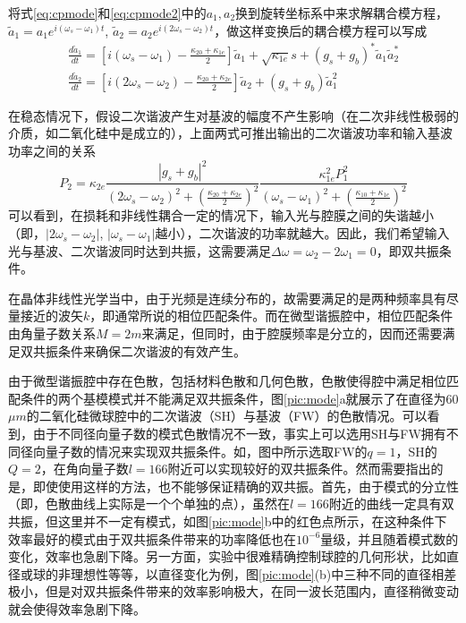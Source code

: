 将式\ref{eq:cpmode}和\ref{eq:cpmode2}中的$a_1, a_2$换到旋转坐标系中来求解耦合模方程，$\tilde{a}_1 = a_1e^{i(\omega_s-\omega_1)t}$, $\tilde{a}_2 = a_2e^{i(2\omega_s-\omega_2)t}$，做这样变换后的耦合模方程可以写成
\begin{gather}
\label{eq:cpmoder}
\frac{d\tilde{a}_1}{dt} = [i(\omega_s-\omega_1)-\frac{\kappa_{20}+\kappa_{1e}}{2}]\tilde{a}_1+\sqrt{\kappa_{1e}}s+(g_s+g_b)^*\tilde{a}_1\tilde{a}_2^* \\
\frac{d\tilde{a}_2}{dt} = [i(2\omega_s-\omega_2)-\frac{\kappa_{20}+\kappa_{2e}}{2}]\tilde{a}_2+(g_s+g_b)\tilde{a}_1^2
\label{eq:cpmoder2}
\end{gather}

在稳态情况下，假设二次谐波产生对基波的幅度不产生影响（在二次非线性极弱的介质，如二氧化硅中是成立的），上面两式可推出输出的二次谐波功率和输入基波功率之间的关系
\begin{equation}
P_2 = \kappa_{2e}\frac{|g_s+g_b|^2}{(2\omega_s-\omega_2)^2+(\frac{\kappa_{20}+\kappa_{2e}}{2})^2}\frac{\kappa_{1e}^2P_1^2}{(\omega_s-\omega_1)^2+(\frac{\kappa_{10}+\kappa_{1e}}{2})^2}
\end{equation}
可以看到，在损耗和非线性耦合一定的情况下，输入光与腔膜之间的失谐越小（即，$|2\omega_s-\omega_2|$, $|\omega_s-\omega_1|$越小），二次谐波的功率就越大。因此，我们希望输入光与基波、二次谐波同时达到共振，这需要满足$\Delta \omega = \omega_2 - 2\omega_1=0$，即双共振条件。

在晶体非线性光学当中，由于光频是连续分布的，故需要满足的是两种频率具有尽量接近的波矢$k$，即通常所说的相位匹配条件。而在微型谐振腔中，相位匹配条件由角量子数关系$M=2m$来满足，但同时，由于腔膜频率是分立的，因而还需要满足双共振条件来确保二次谐波的有效产生。

由于微型谐振腔中存在色散，包括材料色散和几何色散，色散使得腔中满足相位匹配条件的两个基模模式并不能满足双共振条件，图\ref{pic:mode}a就展示了在直径为60$\mu m$的二氧化硅微球腔中的二次谐波（SH）与基波（FW）的色散情况。可以看到，由于不同径向量子数的模式色散情况不一致，事实上可以选用SH与FW拥有不同径向量子数的情况来实现双共振条件。如，图中所示选取FW的$q=1$，SH的$Q=2$，在角向量子数$l=166$附近可以实现较好的双共振条件。然而需要指出的是，即使使用这样的方法，也不能够保证精确的双共振。首先，由于模式的分立性（即，色散曲线上实际是一个个单独的点），虽然在$l=166$附近的曲线一定具有双共振，但这里并不一定有模式，如图\ref{pic:mode}b中的红色点所示，在这种条件下效率最好的模式由于双共振条件带来的功率降低也在$10^{-6}$量级，并且随着模式数的变化，效率也急剧下降。另一方面，实验中很难精确控制球腔的几何形状，比如直径或球的非理想性等等，以直径变化为例，图\ref{pic:mode}(b)中三种不同的直径相差极小，但是对双共振条件带来的效率影响极大，在同一波长范围内，直径稍微变动就会使得效率急剧下降。

